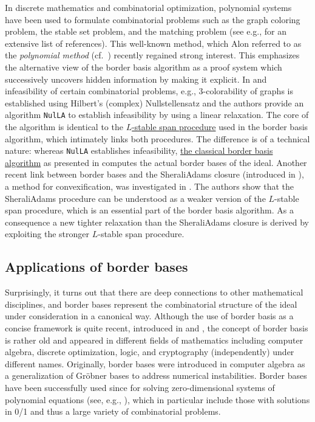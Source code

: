 \documentclass[11pt,oneside,english]{amsart}
\makeatletter
\numberwithin{equation}{section}
\numberwithin{figure}{section}
\theoremstyle{plain}
\theoremstyle{definition}
\theoremstyle{definition}
\theoremstyle{remark}
\theoremstyle{plain}
\theoremstyle{plain}
\theoremstyle{plain}
\theoremstyle{problem@}
\newcounter{problem}
\makeatother
\begin{document}
In discrete mathematics and combinatorial optimization, polynomial
systems have been used to formulate combinatorial problems such as
the graph coloring problem, the stable set problem, and the matching
problem (see e.g., \cite{deLoera2009ecps} for an extensive list of references).
 This well-known method, which Alon referred to as the \emph{polynomial
method} (cf.\ \cite{alon1999PolyMethod,alon1996PolyMethod}) recently
regained strong interest. This emphasizes the alternative view of the border basis algorithm as a proof system which successively uncovers hidden information by making it explicit.  In \cite[Section 2.3]{deLoera2009cpe} and \cite{deLoera2009ecps,deLoera2008hna}
infeasibility of certain combinatorial problems, e.g., 3-colorability
of graphs is established using Hilbert's (complex) Nullstellensatz
and the authors provide an algorithm {\textnormal{\texttt{{NulLA}}}} to establish infeasibility
by using a linear relaxation. The core of the algorithm is identical
to the \hyperref[alg:stableSpan]{$L$-stable span procedure} used in the border basis algorithm,
which intimately links both procedures. The difference is of
a technical nature: whereas {\textnormal{\texttt{{NulLA}}}} establishes
infeasibility,
\hyperref[alg:borderBasis]{the classical border basis algorithm}
as presented in
\cite{kehrein2006cbb} computes the actual border bases of the ideal.
Another recent link between border bases and the Sherali\textendash Adams closure
(introduced in \cite{SA}), a method for convexification, was investigated in \cite{SP20092}.
The authors show that the Sherali\textendash Adams procedure can be understood
as a weaker version of the $L$-stable span procedure, which is an
essential part of the border basis algorithm. As a consequence a new
tighter relaxation than the Sherali\textendash Adams closure is derived by exploiting
the stronger $L$-stable span procedure. 

\subsection{Applications of border bases}
\label{sec:appl-bord-bases}

Surprisingly, it turns out that there are deep connections
to other mathematical disciplines, and border bases represent the combinatorial
structure of the ideal under consideration in a canonical way. Although
the use of border basis as a concise framework is quite recent,
introduced in \cite{kehrein2005cbb,kehrein2006cbb,kehrein14asv} and \cite[Section 6.4]{kreuzer2005cca},
the concept of border basis
is rather old and appeared in different fields of mathematics
including computer algebra, discrete optimization, logic, and cryptography
(independently) under different names. Originally, border bases were
introduced in computer algebra as a generalization of Gröbner bases
to address numerical instabilities. Border bases have been successfully
used since for solving zero-dimensional systems of polynomial equations
(see, e.g., \cite{auzinger1988eac,moller1993sae,mourrain1999ncn}),
which in particular include those with solutions in 0/1 and thus a
large variety of combinatorial problems. 
\end{document}
